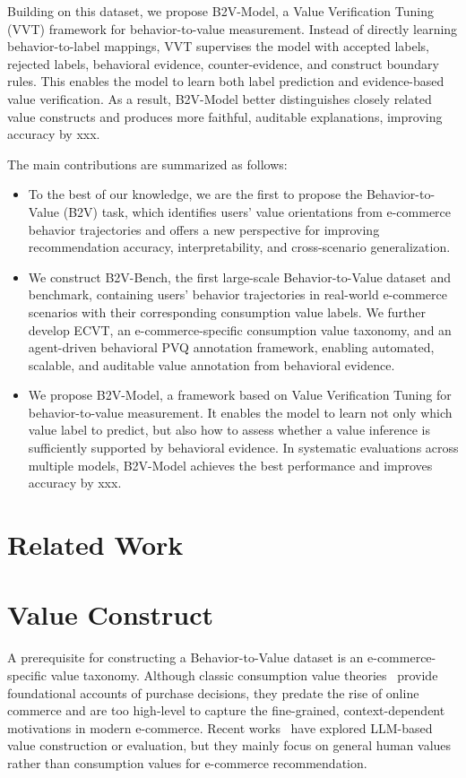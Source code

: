 \documentclass[11pt]{article}
\begin{document}
Building on this dataset, we propose B2V-Model, a Value Verification Tuning (VVT) framework for behavior-to-value measurement. Instead of directly learning behavior-to-label mappings, VVT supervises the model with accepted labels, rejected labels, behavioral evidence, counter-evidence, and construct boundary rules. This enables the model to learn both label prediction and evidence-based value verification. As a result, B2V-Model better distinguishes closely related value constructs and produces more faithful, auditable explanations, improving accuracy by xxx.


The main contributions are summarized as follows:
\begin{itemize}
    \item To the best of our knowledge, we are the first to propose the Behavior-to-Value (B2V) task, which identifies users’ value orientations from e-commerce behavior trajectories and offers a new perspective for improving recommendation accuracy, interpretability, and cross-scenario generalization.

    \item We construct B2V-Bench, the first large-scale Behavior-to-Value dataset and benchmark, containing users’ behavior trajectories in real-world e-commerce scenarios with their corresponding consumption value labels. We further develop ECVT, an e-commerce-specific consumption value taxonomy, and an agent-driven behavioral PVQ annotation framework, enabling automated, scalable, and auditable value annotation from behavioral evidence.

    \item We propose B2V-Model, a framework based on Value Verification Tuning for behavior-to-value measurement. It enables the model to learn not only which value label to predict, but also how to assess whether a value inference is sufficiently supported by behavioral evidence. In systematic evaluations across multiple models, B2V-Model achieves the best performance and improves accuracy by xxx.

\end{itemize}




\section{Related Work}



\section{Value Construct}
A prerequisite for constructing a Behavior-to-Value dataset is an e-commerce-specific value taxonomy. Although classic consumption value theories~\cite{} provide foundational accounts of purchase decisions, they predate the rise of online commerce and are too high-level to capture the fine-grained, context-dependent motivations in modern e-commerce. Recent works~\cite{} have explored LLM-based value construction or evaluation, but they mainly focus on general human values rather than consumption values for e-commerce recommendation. 
\end{document}
